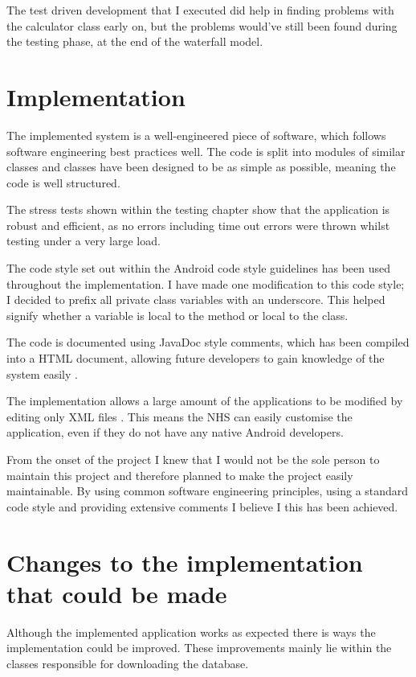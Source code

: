 The test driven development \cite{tdd} that I executed did help in finding problems with the calculator class early on, but the problems would've still been found during the testing phase, at the end of the waterfall model.


\section{Implementation}

The implemented system is a well-engineered piece of software, which follows software engineering best practices well. The code is split into modules of similar classes and classes have been designed to be as simple as possible, meaning the code is well structured. 

The stress tests shown within the testing chapter show that the application is robust and efficient, as no errors including time out errors were thrown whilst testing under a very large load.

The code style set out within the Android code style guidelines \cite{code_style} has been used throughout the implementation. I have made one modification to this code style; I decided to prefix all private class variables with an underscore. This helped signify whether a variable is local to the method or local to the class.

The code is documented using JavaDoc \cite{javadoc} style comments, which has been compiled into a HTML document, allowing future developers to gain knowledge of the system easily \cite{javadoc}. 

The implementation allows a large amount of the applications to be modified by editing only XML files \cite{xml}. This means the NHS can easily customise the application, even if they do not have any native Android developers.

From the onset of the project I knew that I would not be the sole person to maintain this project and therefore planned to make the project easily maintainable. By using common software engineering principles, using a standard code style and providing extensive comments I believe I this has been achieved.


\section{Changes to the implementation that could be made}

Although the implemented application works as expected there is ways the implementation could be improved. These improvements mainly lie within the classes responsible for downloading the database.

